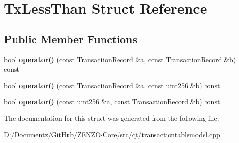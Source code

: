 \hypertarget{struct_tx_less_than}{}\section{Tx\+Less\+Than Struct Reference}
\label{struct_tx_less_than}
\subsection*{Public Member Functions}
\begin{DoxyCompactItemize}
\item 
\mbox{\label{struct_tx_less_than_a3cce66a42f66b3ea9870d54de7e7445a}} 
bool {\bfseries operator()} (const \mbox{\hyperlink{class_transaction_record}{Transaction\+Record}} \&a, const \mbox{\hyperlink{class_transaction_record}{Transaction\+Record}} \&b) const
\item 
\mbox{\label{struct_tx_less_than_a3cf6f43445370a0b1a39f1a820f033cc}} 
bool {\bfseries operator()} (const \mbox{\hyperlink{class_transaction_record}{Transaction\+Record}} \&a, const \mbox{\hyperlink{classuint256}{uint256}} \&b) const
\item 
\mbox{\label{struct_tx_less_than_abc3c26eb0b88cf245e96aa07a1719228}} 
bool {\bfseries operator()} (const \mbox{\hyperlink{classuint256}{uint256}} \&a, const \mbox{\hyperlink{class_transaction_record}{Transaction\+Record}} \&b) const
\end{DoxyCompactItemize}


The documentation for this struct was generated from the following file\+:\begin{DoxyCompactItemize}
\item 
D\+:/\+Documentz/\+Git\+Hub/\+Z\+E\+N\+Z\+O-\/\+Core/src/qt/transactiontablemodel.\+cpp\end{DoxyCompactItemize}
